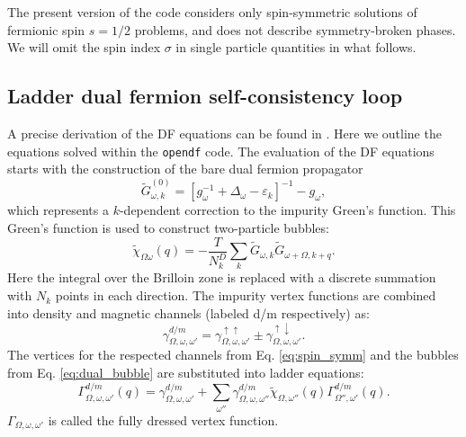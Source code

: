 \documentclass[3p,times,procedia]{elsarticle}
\begin{document}
The present version of the code considers only spin-symmetric solutions of fermionic spin $s=1/2$ problems, and does not describe symmetry-broken phases. We will omit the spin index $\sigma$ in single particle quantities in what follows.


\subsection{Ladder dual fermion self-consistency loop}
A precise derivation of the DF equations can be found in \cite{Hafermann2012, Antipov2014}. Here we outline the equations solved within the \texttt{opendf} code. The evaluation of the DF equations  starts with the construction of the bare dual fermion propagator
\begin{equation}
\tilde G^{(0)}_{\omega,k} = \left[g_{\omega}^{-1} + \Delta_\omega - \varepsilon_k\right]^{-1} - g_{\omega}, \label{eq:gd0}
\end{equation}
which represents a $k$-dependent correction to the impurity Green's function. This Green's function is used to construct two-particle bubbles: 
\begin{equation}\label{eq:dual_bubble}
\tilde \chi_{\Omega\omega}(q) = -\frac{T}{N_k^D} \sum_k \tilde G_{\omega, k} \tilde G_{\omega + \Omega, k+q}.
\end{equation}
Here the integral over the Brilloin zone is replaced with a discrete summation with $N_k$ points in each direction. The impurity vertex functions are combined into density and magnetic channels (labeled d/m respectively) as: 
\begin{equation}\label{eq:spin_symm}
\gamma^{d/m}_{\Omega,\omega,\omega'} = \gamma^{\uparrow\uparrow}_{\Omega,\omega,\omega'} \pm \gamma^{\uparrow\downarrow}_{\Omega,\omega,\omega'}.
\end{equation}
The vertices for the respected channels from Eq. \ref{eq:spin_symm} and the bubbles from Eq. \ref{eq:dual_bubble} are substituted into ladder equations:
\begin{equation}\label{eq:dual_ladder}
\Gamma^{d/m}_{\Omega,\omega,\omega'}(q) = \gamma^{d/m}_{\Omega,\omega,\omega'} + \sum_{\omega''} \gamma^{d/m}_{\Omega,\omega,\omega''} \tilde\chi_{\Omega,\omega''}(q) \Gamma^{d/m}_{\Omega'',\omega'}(q).
\end{equation}
 $\Gamma_{\Omega,\omega,\omega'}$ is called the fully dressed vertex function.
\end{document}
